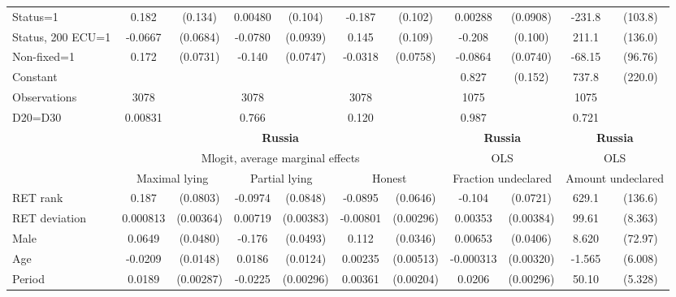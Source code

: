 \begin{tabular}{l|cccccc|cc|cc}
Status=1        &    0.182         &  (0.134)&  0.00480         &  (0.104)&   -0.187\sym{*}  &  (0.102)&  0.00288         & (0.0908)&   -231.8\sym{**} &  (103.8)\\
Status, 200 ECU=1&  -0.0667         & (0.0684)&  -0.0780         & (0.0939)&    0.145         &  (0.109)&   -0.208\sym{**} &  (0.100)&    211.1         &  (136.0)\\
Non-fixed=1     &    0.172\sym{**} & (0.0731)&   -0.140\sym{*}  & (0.0747)&  -0.0318         & (0.0758)&  -0.0864         & (0.0740)&   -68.15         &  (96.76)\\
Constant        &                  &         &                  &         &                  &         &    0.827\sym{***}&  (0.152)&    737.8\sym{***}&  (220.0)\\
\hline
Observations    &     3078         &         &     3078         &         &     3078         &         &     1075         &         &     1075         &         \\
D20=D30         &  0.00831         &         &    0.766         &         &    0.120         &         &    0.987         &         &    0.721         &         \\
\hline\hline
&\multicolumn{6}{c|}{\bf Russia}&\multicolumn{2}{c|}{\bf Russia}&\multicolumn{2}{c}{\bf Russia}\\ &\multicolumn{6}{c|}{Mlogit, average marginal effects }&\multicolumn{2}{c|}{OLS}&\multicolumn{2}{c}{OLS}\\
                &\multicolumn{2}{c}{Maximal lying}&\multicolumn{2}{c}{Partial lying}&\multicolumn{2}{c}{Honest}  &\multicolumn{2}{c}{Fraction undeclared}&\multicolumn{2}{c}{Amount undeclared}\\
\hline
RET rank        &    0.187\sym{**} & (0.0803)&  -0.0974         & (0.0848)&  -0.0895         & (0.0646)&   -0.104         & (0.0721)&    629.1\sym{***}&  (136.6)\\
RET deviation   & 0.000813         &(0.00364)&  0.00719\sym{*}  &(0.00383)& -0.00801\sym{***}&(0.00296)&  0.00353         &(0.00384)&    99.61\sym{***}&  (8.363)\\
Male            &   0.0649         & (0.0480)&   -0.176\sym{***}& (0.0493)&    0.112\sym{***}& (0.0346)&  0.00653         & (0.0406)&    8.620         &  (72.97)\\
Age             &  -0.0209         & (0.0148)&   0.0186         & (0.0124)&  0.00235         &(0.00513)&-0.000313         &(0.00320)&   -1.565         &  (6.008)\\
Period          &   0.0189\sym{***}&(0.00287)&  -0.0225\sym{***}&(0.00296)&  0.00361\sym{*}  &(0.00204)&   0.0206\sym{***}&(0.00296)&    50.10\sym{***}&  (5.328)\\

\end{tabular}
